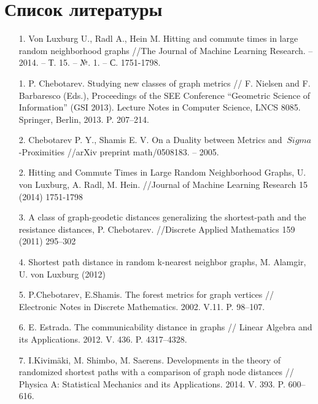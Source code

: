 \clearpage
\chapter*{Список литературы}						%
{}	%

\begin{itemize}
\item[1.] Von Luxburg U., Radl A., Hein M. Hitting and commute times in large random neighborhood graphs //The Journal of Machine Learning Research. – 2014. – Т. 15. – №. 1. – С. 1751-1798.


\item[1.] P. Chebotarev. Studying new classes of graph metrics // F. Nielsen and F. Barbaresco (Eds.), Proceedings of the SEE Conference “Geometric Science of Information” (GSI 2013). Lecture Notes in Computer Science, LNCS 8085. Springer, Berlin, 2013. P. 207–214.

\item[2.] Chebotarev P. Y., Shamis E. V. On a Duality between Metrics and $\ Sigma $-Proximities //arXiv preprint math/0508183. – 2005.

\item[2.] Hitting and Commute Times in Large Random Neighborhood Graphs, U. von Luxburg, A. Radl, M. Hein.
//Journal of Machine Learning Research 15 (2014) 1751-1798

\item[3.] A class of graph-geodetic distances generalizing the shortest-path and the resistance distances, P. Chebotarev. 
//Discrete Applied Mathematics 159 (2011) 295–302

\item[4.] Shortest path distance in random k-nearest neighbor graphs, M. Alamgir, U. von Luxburg (2012)

\item[5.] P.Chebotarev, E.Shamis. The forest metrics for graph vertices // Electronic Notes in Discrete Mathematics. 2002. V.11. P. 98–107.

\item[6.] E. Estrada. The communicability distance in graphs // Linear Algebra and its Applications. 2012. V. 436. P. 4317–4328.

\item[7.] I.Kivimäki, M. Shimbo, M. Saerens. Developments in the theory of randomized shortest paths with a comparison of graph node distances // Physica A: Statistical Mechanics and its Applications. 2014. V. 393. P. 600–616.
 

\end{itemize}
